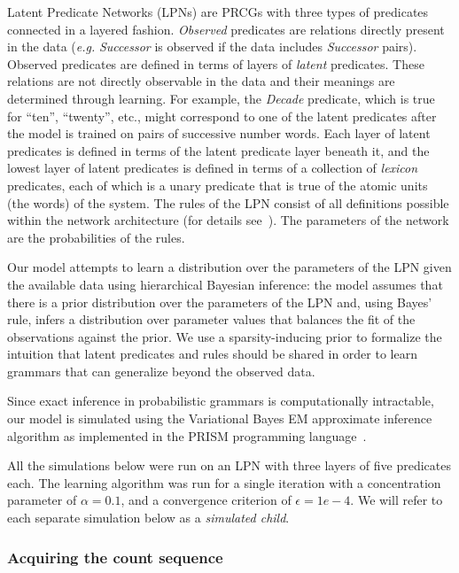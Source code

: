 \documentclass[10pt,letterpaper]{article}
\begin{document}
Latent Predicate Networks (LPNs) are PRCGs with three types of
predicates connected in a layered fashion. \emph{Observed} predicates
are relations directly present in the data ({\it e.g.} \emph{Successor} is
observed if the data includes \emph{Successor} pairs). Observed
predicates are defined in terms of layers of \emph{latent} predicates.
These relations are not directly observable in the data and their
meanings are determined through learning. For example, the
\emph{Decade} predicate, which is true for ``ten'', ``twenty'', etc.,
might correspond to one of the latent predicates after the model is
trained on pairs of successive number words. Each layer of latent
predicates is defined in terms of the latent predicate layer beneath
it, and the lowest layer of latent predicates is defined in terms of a
collection of \emph{lexicon} predicates, each of which is a unary
predicate that is true of the atomic units (the words) of the system.
The rules of the LPN consist of all definitions possible within the
network architecture (for details see~\cite{DecRulTen2015}). The
parameters of the network are the probabilities of the rules.

Our model attempts to learn a distribution over the parameters of the
LPN given the available data using hierarchical Bayesian inference:
the model assumes that there is a prior distribution over the
parameters of the LPN and, using Bayes' rule, infers a distribution
over parameter values that balances the fit of the observations
against the prior. We use a sparsity-inducing prior to formalize the
intuition that latent predicates and rules should be shared in order
to learn grammars that can generalize beyond the observed data.

Since exact inference in probabilistic grammars is computationally
intractable, our model is simulated using the Variational Bayes EM
approximate inference algorithm as implemented in the PRISM
programming language~\citep{sato2008variational}.

All the simulations below were run on an LPN with three layers of five
predicates each. The learning algorithm was run for a single
iteration with a concentration parameter of $\alpha=0.1$, and a convergence
criterion of $\epsilon=1e-4$. We will refer to each separate
simulation below as a \emph{simulated child}.

\subsubsection{Acquiring the count sequence}
\end{document}
